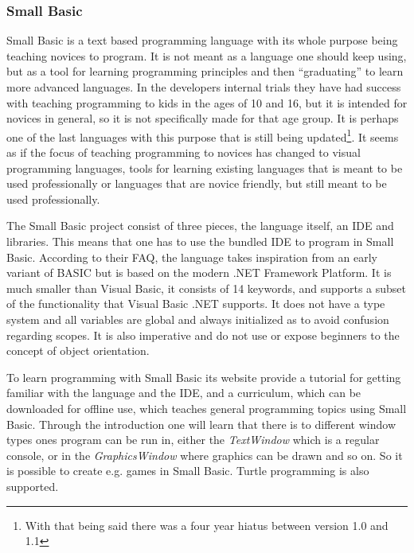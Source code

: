 \subsubsection{Small Basic}
Small Basic is a text based programming language with its whole purpose being teaching novices to program. It is not meant as a language one should keep using, but as a tool for learning programming principles and then ``graduating'' to learn more advanced languages. In the developers internal trials they have had success with teaching programming to kids in the ages of 10 and 16, but it is intended for novices in general, so it is not specifically made for that age group\cite{smallbasic_faq}. It is perhaps one of the last languages with this purpose that is still being updated\footnote{With that being said there was a four year hiatus between version 1.0 and 1.1}. It seems as if the focus of teaching programming to novices has changed to visual programming languages, tools for learning existing languages that is meant to be used professionally or languages that are novice friendly, but still meant to be used professionally.

The Small Basic project consist of three pieces, the language itself, an IDE and libraries. This means that one has to use the bundled IDE to program in Small Basic. According to their FAQ\cite{smallbasic_faq}, the language takes inspiration from an early variant of BASIC but is based on the modern .NET Framework Platform. It is much smaller than Visual Basic, it consists of 14 keywords, and supports a subset of the functionality that Visual Basic .NET supports. It does not have a type system and all variables are global and always initialized as to avoid confusion regarding scopes. It is also imperative and do not use or expose beginners to the concept of object orientation.

To learn programming with Small Basic its website provide a tutorial for getting familiar with the language and the IDE\cite{smallbasic_intro}, and a curriculum, which can be downloaded for offline use, which teaches general programming topics using Small Basic\cite{smallbasic_curriculum}. Through the introduction one will learn that there is to different window types ones program can be run in, either the \emph{TextWindow} which is a regular console, or in the \emph{GraphicsWindow} where graphics can be drawn and so on. So it is possible to create e.g. games in Small Basic. Turtle programming is also supported.

